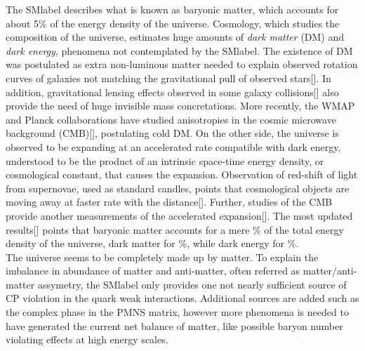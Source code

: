 The \acrshort{SMlabel} describes what is known as baryonic matter, which accounts for about 5\% of the energy density of the universe. Cosmology, which studies the composition of the universe, estimates huge amounts of \textit{dark matter} (DM) and \textit{dark energy}, phenomena not contemplated by the \acrshort{SMlabel}. The existence of DM was postulated as extra non-luminous matter needed to explain observed rotation curves of galaxies not matching the gravitational pull of observed stars[]. In addition, gravitational lensing effects observed in some galaxy collisions[] also provide the need of huge invisible mass concretations. More recently, the WMAP and Planck collaborations have studied anisotropies in the cosmic microwave background (CMB)[], postulating cold DM. On the other side, the universe is observed to be expanding at an accelerated rate compatible with dark energy, understood to be the product of an intrinsic space-time energy density, or cosmological constant, that causes the expansion. Observation of red-shift of light from supernovae, used as standard candles, points that cosmological objects are moving away at faster rate with the distance[]. Further, studies of the CMB provide another measurements of the accelerated expansion[]. The most updated results[] points that baryonic matter accounts for a mere \% of the total energy density of the universe, dark matter for \%, while dark energy for \%.\\

The universe seems to be completely made up by matter. To explain the imbalance in abundance of matter and anti-matter, often referred as matter/anti-matter assymetry, the \acrshort{SMlabel} only provides one not nearly sufficient source of CP violation in the quark weak interactions. Additional sources are added such as the complex phase in the PMNS matrix, however more phenomena is needed to have generated the current net balance of matter, like possible baryon number violating effects at high energy scales.\\

